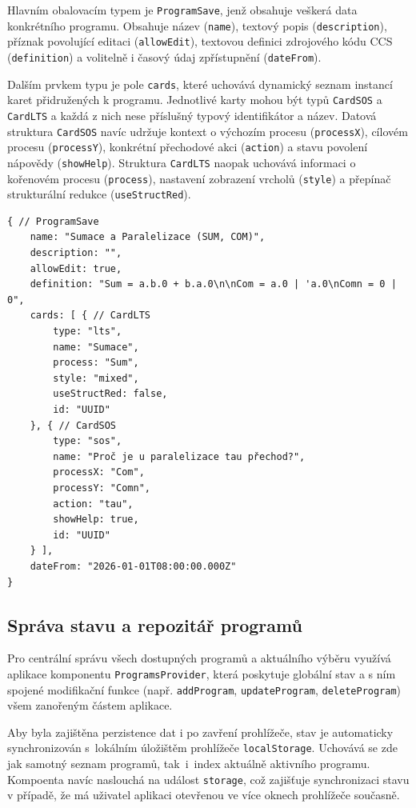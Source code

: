 Hlavním obalovacím typem je \texttt{ProgramSave}, jenž obsahuje veškerá data konkrétního programu. 
Obsahuje název (\texttt{name}), textový popis (\texttt{description}), příznak povolující editaci (\texttt{allowEdit}), textovou definici zdrojového kódu CCS (\texttt{definition}) a volitelně i časový údaj zpřístupnění (\texttt{dateFrom}). 

Dalším prvkem typu je pole \texttt{cards}, které uchovává dynamický seznam instancí karet přidružených k programu. 
Jednotlivé karty mohou být typů \texttt{CardSOS} a \texttt{CardLTS} a každá z nich nese příslušný typový identifikátor a název. 
Datová struktura \texttt{CardSOS} navíc udržuje kontext o výchozím procesu (\texttt{processX}), cílovém procesu (\texttt{processY}), konkrétní přechodové akci (\texttt{action}) a stavu povolení nápovědy (\texttt{showHelp}). 
Struktura \texttt{CardLTS} naopak uchovává informaci o kořenovém procesu (\texttt{process}), nastavení zobrazení vrcholů (\texttt{style}) a přepínač strukturální redukce (\texttt{useStructRed}). 

\begin{lstlisting}[label=lst:json-config,caption={Zkrácená ukázka JSON datového formátu programu \texttt{Sumace a Paralelizace}.}]
{ // ProgramSave
    name: "Sumace a Paralelizace (SUM, COM)",
    description: "",
    allowEdit: true,
    definition: "Sum = a.b.0 + b.a.0\n\nCom = a.0 | 'a.0\nComn = 0 | 0",
    cards: [ { // CardLTS
        type: "lts", 
        name: "Sumace", 
        process: "Sum", 
        style: "mixed", 
        useStructRed: false,
        id: "UUID"
    }, { // CardSOS
        type: "sos", 
        name: "Proč je u paralelizace tau přechod?", 
        processX: "Com", 
        processY: "Comn", 
        action: "tau", 
        showHelp: true,
        id: "UUID"
    } ],
    dateFrom: "2026-01-01T08:00:00.000Z"
}
\end{lstlisting}

\subsection{Správa stavu a repozitář programů}
\label{sec:programs_store}
Pro centrální správu všech dostupných programů a aktuálního výběru využívá aplikace komponentu \texttt{ProgramsProvider}, která poskytuje globální stav a s ním spojené modifikační funkce (např. \texttt{addProgram}, \texttt{updateProgram}, \texttt{deleteProgram}) všem zanořeným částem aplikace.

Aby byla zajištěna perzistence dat i po zavření prohlížeče, stav je automaticky synchronizován s~lokálním úložištěm prohlížeče \texttt{localStorage}.
Uchovává se zde jak samotný seznam programů, tak~i~index aktuálně aktivního programu. 
Kompoenta navíc naslouchá na událost \texttt{storage}, což zajišťuje synchronizaci stavu v případě, že má uživatel aplikaci otevřenou ve více oknech prohlížeče současně.

